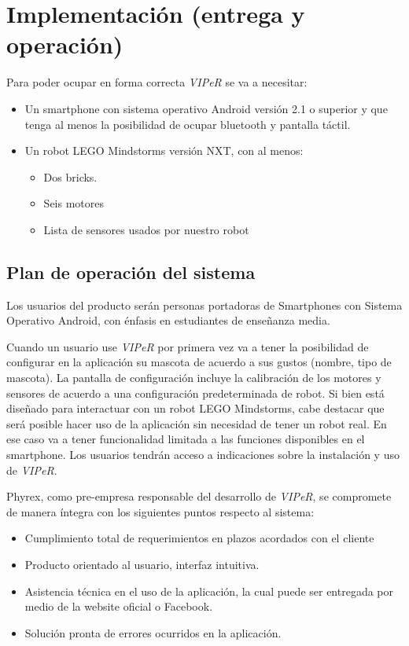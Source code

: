 \chapter{Implementaci\'on (entrega y operaci\'on)}
\newpage
Para poder ocupar en forma correcta \emph{VIPeR} se va a necesitar:
\begin{itemize}
\item Un smartphone con sistema operativo Android versi\'on 2.1 o superior y que tenga al menos la posibilidad de ocupar bluetooth y pantalla t\'actil.
\item Un robot LEGO Mindstorms versi\'on NXT, con al menos:
  \begin{itemize}
  \item Dos bricks. 
  \item Seis motores
  \item Lista de sensores usados por nuestro robot
  \end{itemize}
\end{itemize}

%
%
\section{Plan de operaci\'on del sistema}
Los usuarios del producto ser\'an personas portadoras de Smartphones con Sistema Operativo Android, con \'enfasis en estudiantes de ense\~nanza media. 

Cuando un usuario use \emph{VIPeR} por primera vez va a tener la posibilidad de configurar en la aplicaci\'on su mascota de acuerdo a sus gustos (nombre, tipo de mascota). La pantalla de configuraci\'on incluye la calibraci\'on de los motores y sensores de acuerdo a una configuraci\'on predeterminada de robot. Si bien est\'a dise\~nado para interactuar con un robot LEGO Mindstorms, cabe destacar que ser\'a posible hacer uso de la aplicaci\'on sin necesidad de tener un robot real. En ese caso va a tener funcionalidad limitada a las funciones disponibles en el smartphone. Los usuarios tendr\'an acceso a indicaciones sobre la instalaci\'on y uso de \emph{VIPeR}.

Phyrex, como pre-empresa responsable del desarrollo de \emph{VIPeR}, se compromete de manera \'integra con los siguientes puntos respecto al sistema:
\begin{itemize}
\item Cumplimiento total de requerimientos en plazos acordados con el cliente
\item Producto orientado al usuario, interfaz intuitiva.
\item Asistencia t\'ecnica en el uso de la aplicaci\'on, la cual puede ser entregada por medio de la website oficial o Facebook.
\item Soluci\'on pronta de errores ocurridos en la aplicaci\'on.
\end{itemize}

